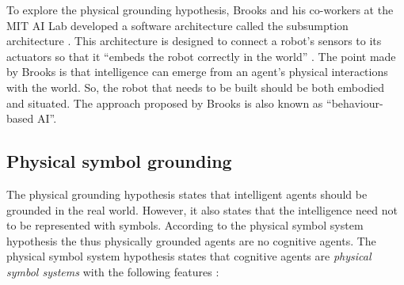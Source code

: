 
To explore the physical grounding hypothesis, Brooks and his co-workers at the MIT AI Lab developed a software architecture called the {\sc subsumption architecture} \citep{brooks:1986}. This architecture is designed to connect a robot's sensors to its actuators so that it ``embeds the robot correctly in the world'' \citep{brooks:1990}.  The point made by Brooks is that intelligence can emerge from an agent's physical interactions with the world. So, the robot that needs to be built should be both embodied and situated. The approach proposed by Brooks is also known as ``behaviour-based AI''.


\subsection{Physical symbol grounding}

The physical grounding hypothesis \citep{brooks:1990} states that intelligent agents should be grounded in the real world. However, it also states that the intelligence need not to be represented with symbols. According to the physical symbol system hypothesis the thus physically grounded agents are no cognitive agents. The physical symbol system hypothesis \citep{newell:1980} states that cognitive agents are {\em physical symbol systems} with the following features \citep[77]{newell:1990}:


